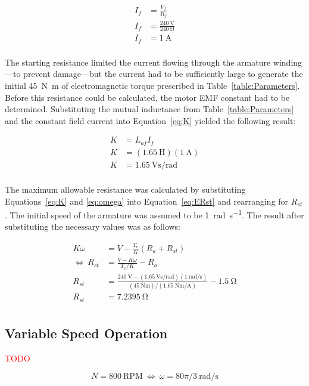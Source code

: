 \documentclass[a4paper,10pt]{article}
\newcommand{\V}{\si{\volt}\xspace}
\newcommand{\A}{\si{\ampere}\xspace}
\newcommand{\Ohm}{\si{\ohm}\xspace}
\renewcommand{\H}{\si{\henry}\xspace}
\newcommand{\Nm}{\si{\newton\metre}\xspace}
\newcommand{\rps}{\si{\radian\per\second}\xspace}
\newcommand{\RPM}{\text{RPM}\xspace}
\newcommand{\Vspr}{\si{\volt\second\per\radian}\xspace}
\newcommand{\NmpA}{\si{\newton\metre\per\ampere}\xspace}
\begin{document}
\begin{align*}
    I_f &= \frac{V_f}{R_f} \\
    I_f &= \frac{240~\V}{240~\Ohm} \\
    I_f &= 1~\A \\
\end{align*}

The starting resistance limited the current flowing through the armature 
winding---to prevent damage---but the current had to be sufficiently large to 
generate the initial 45~\Nm of electromagnetic torque prescribed in 
Table~\ref{table:Parameters}. Before this resistance could be calculated, the 
motor EMF constant had to be determined. Substituting the mutual inductance 
from Table~\ref{table:Parameters} and the constant field current into 
Equation~\ref{eq:K} yielded the following result:

\begin{align*}
    K &= L_{af} I_f \\
    K &= (1.65~\H) (1~\A) \\
    K &= 1.65~\Vspr \\
\end{align*}

The maximum allowable resistance was calculated by substituting 
Equations~\ref{eq:K} and \ref{eq:omega} into Equation~\ref{eq:ERst} and 
rearranging for $R_{st}$. The initial speed of the armature was assumed to be 
1~\rps. The result after substituting the necessary values was as follows:

\begin{align*} \label{calc:Rst}
    K \omega &= V - \frac{T_e}{K}(R_a + R_{st}) \\
    \Leftrightarrow~ R_{st} &= \frac{V - K\omega}{T_e/K} - R_a \\
    R_{st} &= \frac{240~\V - (1.65~\Vspr)(1~\rps)}{(45~\Nm)/(1.65~\NmpA)}
        - 1.5~\Ohm \\
    R_{st} &= 7.2395~\Ohm \\
\end{align*}

\subsection{Variable Speed Operation}

\textcolor{red}{TODO}

\begin{equation*}
    N = 800~\RPM~\Leftrightarrow~\omega = 80\pi/3~\rps
\end{equation*}
\end{document}
